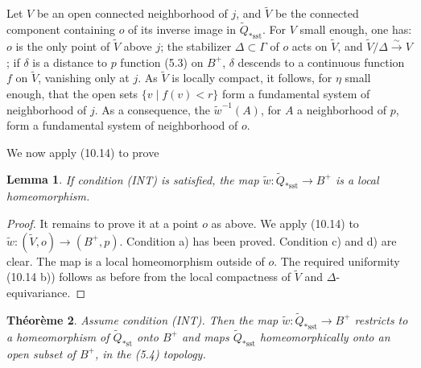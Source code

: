 \documentclass[12pt,a4paper]{article}
\theoremstyle{plain}
\newtheorem{theorem}{Th\'eor\`eme}[section]
\newtheorem{lemma}[theorem]{Lemma}
\theoremstyle{definition}
\theoremstyle{remark}
\begin{document}
Let $V$ be an open connected neighborhood of $j$, and $\widetilde{V}$ be the connected component containing $o$ of its inverse image in $\widetilde{Q}_{*\text{sst}}$. For $V$ small enough, one has: $o$ is the only point of $\widetilde{V}$ above $j$; the stabilizer $\Delta \subset \Gamma$ of $o$ acts on $\widetilde{V}$, and $\widetilde{V}/\Delta \xrightarrow{\sim} V$; if $\delta$ is a distance to $p$ function (5.3) on $B^+$, $\delta$ descends to a continuous function $f$ on $\widetilde{V}$, vanishing only at $j$. As $\widetilde{V}$ is locally compact, it follows, for $\eta$ small enough, that the open sets $\{v \mid f(v) < r\}$ form a fundamental system of neighborhood of $j$. As a consequence, the $\widetilde{w}^{-1}(A)$, for $A$ a neighborhood of $p$, form a fundamental system of neighborhood of $o$.

We now apply (10.14) to prove

\begin{lemma}
\label{10.18.1}
If condition (INT) is satisfied, the map $\widetilde{w} : \widetilde{Q}_{*\text{sst}} \to B^+$ is a local homeomorphism.
\end{lemma}

\begin{proof}
It remains to prove it at a point $o$ as above. We apply (10.14) to $\widetilde{w} : (\widetilde{V}, o) \to (B^+, p)$. Condition a) has been proved. Condition c) and d) are clear. The map is a local homeomorphism outside of $o$. The required uniformity (10.14 b)) follows as before from the local compactness of $\widetilde{V}$ and $\Delta$-equivariance.
\end{proof}

\begin{theorem}
\label{10.18.2}
Assume condition (INT). Then the map $\widetilde{w} : \widetilde{Q}_{*\text{sst}} \to B^+$ restricts to a homeomorphism of $\widetilde{Q}_{*\text{st}}$ onto $B^+$ and maps $\widetilde{Q}_{*\text{sst}}$ homeomorphically onto an open subset of $B^+$, in the (5.4) topology.
\end{theorem}
\end{document}
